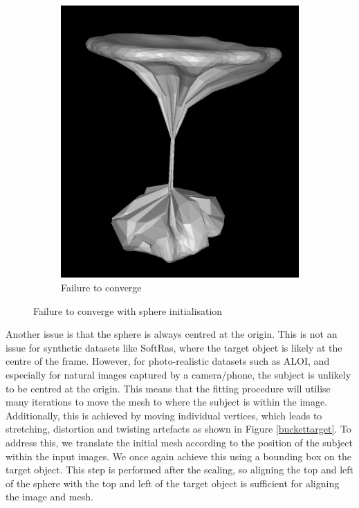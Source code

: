 \documentclass{article}
\begin{document}
\begin{figure}[h!]
  \hfill
  \begin{subfigure}{0.25\textwidth}
    \centering
    \includegraphics[width=\textwidth]{images/apricotfailure.png}
    \caption{Failure to converge}
    \label{apricotfailure}
  \end{subfigure}
  \caption{Failure to converge with sphere initialisation}
  \label{apricottarget}
\end{figure}

Another issue is that the sphere is always centred at the origin. This is not an issue for synthetic datasets like SoftRas, where the target object is likely at the centre of the frame. However, for photo-realistic datasets such as ALOI, and especially for natural images captured by a camera/phone, the subject is unlikely to be centred at the origin. This means that the fitting procedure will utilise many iterations to move the mesh to where the subject is within the image. Additionally, this is achieved by moving individual vertices, which leads to stretching, distortion and twisting artefacts as shown in Figure \ref{buckettarget}. To address this, we translate the initial mesh according to the position of the subject within the input images. We once again achieve this using a bounding box on the target object. This step is performed after the scaling, so aligning the top and left of the sphere with the top and left of the target object is sufficient for aligning the image and mesh.
\end{document}

